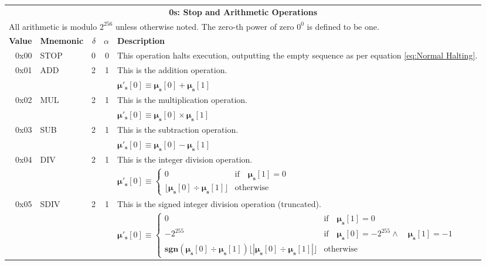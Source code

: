 \documentclass[9pt,oneside]{amsart}
\begin{document}
\begin{tabularx}{\textwidth}{rlrrX}
\toprule
\multicolumn{5}{c}{\textbf{0s: Stop and Arithmetic Operations}} \\
\multicolumn{5}{l}{All arithmetic is modulo $2^{256}$ unless otherwise noted. The zero-th power of zero $0^0$ is defined to be one.} \vspace{5pt} \\
\textbf{Value} & \textbf{Mnemonic} & $\delta$ & $\alpha$ & \textbf{Description} \vspace{5pt} \\
0x00 & {\small STOP} & 0 & 0 & This operation halts execution, outputting the empty sequence as per equation \ref{eq:Normal Halting}.
\\
\midrule
0x01 & {\small ADD} & 2 & 1 & This is the addition operation. \\
&&&& $\boldsymbol{\mu}'_\mathbf{s}[0] \equiv \boldsymbol{\mu}_\mathbf{s}[0] + \boldsymbol{\mu}_\mathbf{s}[1]$ \\
\midrule
0x02 & {\small MUL} & 2 & 1 & This is the multiplication operation. \\
&&&& $\boldsymbol{\mu}'_\mathbf{s}[0] \equiv \boldsymbol{\mu}_\mathbf{s}[0] \times \boldsymbol{\mu}_\mathbf{s}[1]$ \\
\midrule
0x03 & {\small SUB} & 2 & 1 & This is the subtraction operation. \\
&&&& $\boldsymbol{\mu}'_\mathbf{s}[0] \equiv \boldsymbol{\mu}_\mathbf{s}[0] - \boldsymbol{\mu}_\mathbf{s}[1]$ \\
\midrule
0x04 & {\small DIV} & 2 & 1 & This is the integer division operation. \\
&&&& $\boldsymbol{\mu}'_\mathbf{s}[0] \equiv \begin{cases}0 & \text{if} \quad \boldsymbol{\mu}_\mathbf{s}[1] = 0\\ \lfloor\boldsymbol{\mu}_\mathbf{s}[0] \div \boldsymbol{\mu}_\mathbf{s}[1]\rfloor & \text{otherwise}\end{cases}$  \\
\midrule
0x05 & {\small SDIV} & 2 & 1 & This is the signed integer division operation (truncated). \\
&&&& $\boldsymbol{\mu}'_\mathbf{s}[0] \equiv \begin{cases}0 & \text{if} \quad \boldsymbol{\mu}_\mathbf{s}[1] = 0\\ -2^{255} & \text{if} \quad \boldsymbol{\mu}_\mathbf{s}[0] = -2^{255} \wedge \quad \boldsymbol{\mu}_\mathbf{s}[1] = -1\\ \mathbf{sgn} (\boldsymbol{\mu}_\mathbf{s}[0] \div \boldsymbol{\mu}_\mathbf{s}[1]) \lfloor |\boldsymbol{\mu}_\mathbf{s}[0] \div \boldsymbol{\mu}_\mathbf{s}[1]| \rfloor & \text{otherwise}\end{cases}$  \\

\end{tabularx}
\end{document}
